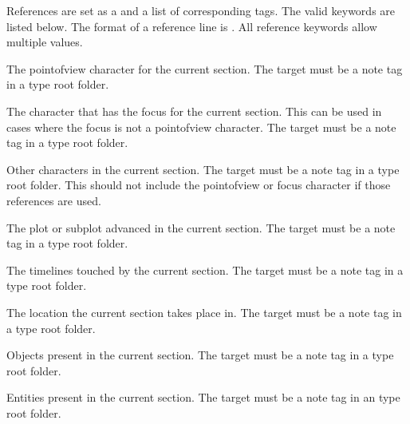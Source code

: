\documentclass[a4paper,11pt,english]{sphinxmanual}
\begin{document}
\sphinxAtStartPar
References are set as a {\hyperref[\detokenize{int_glossary:term-Keyword}]{}} and a list of corresponding tags. The valid keywords are
listed below. The format of a reference line is . All
reference keywords allow multiple values.
\begin{description}
\sphinxAtStartPar
The point\sphinxhyphen{}of\sphinxhyphen{}view character for the current section. The target must be a note tag in a
 type root folder.

\sphinxAtStartPar
The character that has the focus for the current section. This can be used in cases where the
focus is not a point\sphinxhyphen{}of\sphinxhyphen{}view character. The target must be a note tag in a  type
root folder.

\sphinxAtStartPar
Other characters in the current section. The target must be a note tag in a  type
root folder. This should not include the point\sphinxhyphen{}of\sphinxhyphen{}view or focus character if those references
are used.

\sphinxAtStartPar
The plot or subplot advanced in the current section. The target must be a note tag in a 
type root folder.

\sphinxAtStartPar
The timelines touched by the current section. The target must be a note tag in a 
type root folder.

\sphinxAtStartPar
The location the current section takes place in. The target must be a note tag in a
 type root folder.

\sphinxAtStartPar
Objects present in the current section. The target must be a note tag in a  type root
folder.

\sphinxAtStartPar
Entities present in the current section. The target must be a note tag in an  type
root folder.


\end{description}
\end{document}
